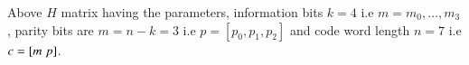 \documentclass[journal,12pt,twocolumn]{IEEEtran}
\begin{document}
Above $H$ matrix having the parameters, information bits $k=4$ i.e $m=m_0,\dots,m_3$ , parity bits are $m=n-k=3$ i.e $p=[p_0,p_1,p_2]$ and  code word length $n=7$ i.e $c=[m\hspace{1mm}p]$.
\begin{figure}[!ht]
\begin{center}
%
%
%    
%
%
%
%
%
%

\end{center}
\end{figure}
\end{document}
